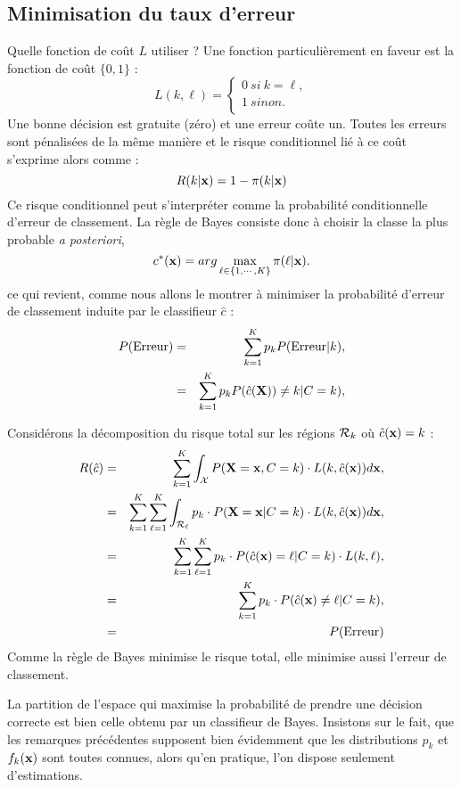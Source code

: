 \subsection{Minimisation du taux d'erreur}

Quelle fonction de co\^ut $L$ utiliser ? Une fonction particuli\`erement en faveur 
est la fonction de co\^ut $\{0,1\}$ :
$$
L(k,\ell)=
\left \{ \begin{array}{l}
0 \ si \ k=\ell, \\
1 \ sinon.\\
\end{array}
\right .
$$
Une bonne d\'ecision est gratuite (z\'ero) et une erreur co\^ute un. Toutes
les erreurs sont p\'enalis\'ees de la m\^eme mani\`ere et le risque 
conditionnel li\'e \`a ce co\^ut s'exprime alors comme :
$$
R(k|\mbox{\bf x})=1-\pi(k|\mbox{\bf x})
$$
Ce risque conditionnel peut s'interpr\'eter comme la probabilit\'e
conditionnelle d'erreur de classement.  
La r\`egle de Bayes consiste donc \`a choisir la classe la plus probable 
{\em a posteriori},
$$
c^*(\mbox{\bf x})=arg \max_{\ell \in \{1,\cdots,K \}} \pi(\ell | \mbox{\bf x}).
$$
ce qui revient, comme nous allons le montrer 
\`a minimiser la probabilit\'e d'erreur de classement induite par le 
classifieur $\hat{c}$ :
\begin{eqnarray*}
P(\mbox{Erreur}) & =  & \sum_{k=1}^{K} p_k  P(\mbox{Erreur} | k),\\
                 & =  & \sum_{k=1}^{K} p_k  P( \hat{c}(\mbox{\bf X}))\neq k| C=k),
\end{eqnarray*}


Consid\'erons la d\'ecomposition du  risque total sur les r\'egions ${\cal R}_k$
o\`u $\hat{c}(\mbox{\bf x})=k$ :
\begin{eqnarray*}
R(\hat{c})& = & \sum_{k=1}^K \int_{\cal X} P(\mbox{\bf X}=\mbox{\bf x},C=k) \cdot L(k,\hat{c}(\mbox{\bf x})) d\mbox{\bf x},\\
&  = & \sum_{k=1}^K \sum_{\ell=1}^K \int_{{\cal R}_{\ell}} p_k \cdot P(\mbox{\bf X}=\mbox{\bf x} | C=k)  \cdot L(k,\hat{c}(\mbox{\bf x})) d\mbox{\bf x},\\
&  = & \sum_{k=1}^K \sum_{\ell=1}^K  p_k \cdot P(\hat{c}(\mbox{\bf x})=\ell | C=k) \cdot L(k,\ell),\\
&  = & \sum_{k=1}^K   p_k \cdot P(\hat{c}(\mbox{\bf x}) \neq \ell | C=k),\\
&  = & P(\mbox{Erreur})
\end{eqnarray*}
Comme la r\`egle de Bayes minimise le risque total, elle minimise aussi l'erreur de classement.

La partition de l'espace qui maximise la probabilit\'e de prendre une 
d\'ecision correcte est bien  celle obtenu par un classifieur de
Bayes. Insistons sur le fait,  que les remarques pr\'ec\'edentes supposent bien 
\'evidemment que les distributions $p_k$ et $f_k(\mbox{\bf x})$ sont toutes connues, alors
qu'en pratique, l'on dispose seulement d'estimations. 




